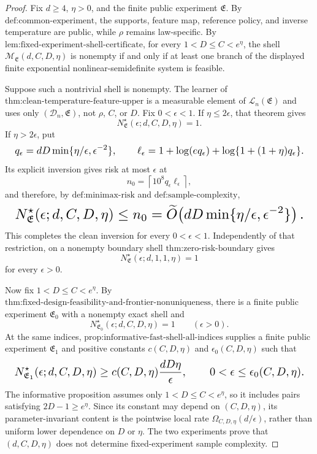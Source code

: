 \documentclass{article}
\begin{document}
\begin{proof}
Fix \(d\ge4\), \(\eta>0\), and the finite public experiment \(\mathfrak E\). By \(\text{def:common-experiment}\), the supports, feature map, reference policy, and inverse temperature are public, while \(\rho\) remains law-specific. By \(\text{lem:fixed-experiment-shell-certificate}\), for every \(1<D\le C<e^\eta\), the shell \(\mathcal M_{\mathfrak E}(d,C,D,\eta)\) is nonempty if and only if at least one branch of the displayed finite exponential nonlinear-semidefinite system is feasible.

Suppose such a nontrivial shell is nonempty. The learner of \(\text{thm:clean-temperature-feature-upper}\) is a measurable element of \(\mathcal L_n(\mathfrak E)\) and uses only \((\mathcal D_n,\mathfrak E)\), not \(\rho\), \(C\), or \(D\). Fix \(0<\epsilon<1\). If \(\eta\le2\epsilon\), that theorem gives
\[
N^\star_{\mathfrak E}(\epsilon;d,C,D,\eta)=1.
\]
If \(\eta>2\epsilon\), put
\[
\makebox[\linewidth][c]{\resizebox{0.98\linewidth}{!}{\(\displaystyle q_\epsilon=dD\min\{\eta/\epsilon,\epsilon^{-2}\},
\qquad
\ell_\epsilon=1+\log(eq_\epsilon)+\log\{1+(1+\eta)q_\epsilon\}.\)}}
\]
Its explicit inversion gives risk at most \(\epsilon\) at
\[
n_0=\left\lceil10^8q_\epsilon\ell_\epsilon\right\rceil,
\]
and therefore, by \(\text{def:minimax-risk}\) and \(\text{def:sample-complexity}\),
\[
\makebox[\linewidth][c]{\resizebox{0.98\linewidth}{!}{\(\displaystyle N^\star_{\mathfrak E}(\epsilon;d,C,D,\eta)
\le n_0
=\widetilde O\!\left(dD\min\{\eta/\epsilon,\epsilon^{-2}\}\right).\)}}
\]
This completes the clean inversion for every \(0<\epsilon<1\). Independently of that restriction, on a nonempty boundary shell \(\text{thm:zero-risk-boundary}\) gives
\[
N^\star_{\mathfrak E}(\epsilon;d,1,1,\eta)=1
\]
for every \(\epsilon>0\).

Now fix \(1<D\le C<e^\eta\). By \(\text{thm:fixed-design-feasibility-and-frontier-nonuniqueness}\), there is a finite public experiment \(\mathfrak E_0\) with a nonempty exact shell and
\[
N^\star_{\mathfrak E_0}(\epsilon;d,C,D,\eta)=1
\qquad(\epsilon>0).
\]
At the same indices, \(\text{prop:informative-fast-shell-all-indices}\) supplies a finite public experiment \(\mathfrak E_1\) and positive constants \(c(C,D,\eta)\) and \(\epsilon_0(C,D,\eta)\) such that
\[
\makebox[\linewidth][c]{\resizebox{0.98\linewidth}{!}{\(\displaystyle N^\star_{\mathfrak E_1}(\epsilon;d,C,D,\eta)
\ge c(C,D,\eta)\frac{dD\eta}{\epsilon},
\qquad 0<\epsilon\le\epsilon_0(C,D,\eta).\)}}
\]
The informative proposition assumes only \(1<D\le C<e^\eta\), so it includes pairs satisfying \(2D-1\ge e^\eta\). Since its constant may depend on \((C,D,\eta)\), its parameter-invariant content is the pointwise local rate \(\Omega_{C,D,\eta}(d/\epsilon)\), rather than uniform lower dependence on \(D\) or \(\eta\). The two experiments prove that \((d,C,D,\eta)\) does not determine fixed-experiment sample complexity.


\end{proof}
\end{document}
